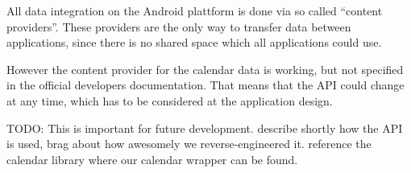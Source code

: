 All data integration on the Android plattform is done via
so called ``content providers''. These providers are the
only way to transfer data between applications, since there
is no shared space which all applications could use.

However the content provider for the calendar data is
working, but not specified in the official developers
documentation. That means that the API could change at
any time, which has to be considered at the application
design.

TODO: This is important for future development. describe shortly how the API is used, brag about how awesomely we reverse-engineered it. reference the calendar library where our calendar wrapper can be found.
